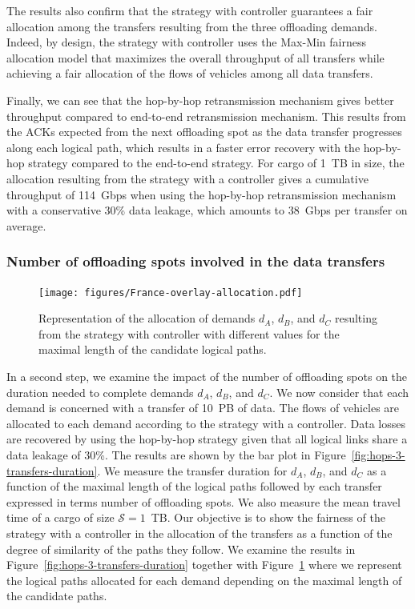 The results also confirm that the strategy with controller guarantees a fair allocation among the transfers resulting from the three offloading demands. Indeed, by design, the strategy with controller uses the \textsf{Max-Min fairness} allocation model that maximizes the overall throughput of all transfers while achieving a fair allocation of the flows of vehicles among all data transfers.

Finally, we can see that the \textsf{hop-by-hop} retransmission mechanism gives better throughput compared to \textsf{end-to-end} retransmission mechanism. This results from the ACKs expected from the next offloading spot as the data transfer progresses along each logical path, which results in a faster error recovery with the \textsf{hop-by-hop} strategy compared to the \textsf{end-to-end} strategy. For cargo of 1~TB in size, the allocation resulting from the strategy with a controller gives a cumulative throughput of 114~Gbps when using the  \textsf{hop-by-hop} retransmission mechanism with a conservative 30\% data leakage, which amounts to 38~Gbps per transfer on average. 


\subsubsection{Number of offloading spots involved in the data transfers} 
\begin{figure}[t]
    \centering
    \texttt{[image: figures/France-overlay-allocation.pdf]}
    \caption{Representation of the allocation of demands $d_A$, $d_B$, and $d_C$ resulting from the strategy with controller with different values for the maximal length of the candidate logical paths.}
    \label{fig:france-demand-allocation}
\end{figure}

In a second step, we examine the impact of the number of offloading spots on the duration needed to complete demands $d_A$, $d_B$, and $d_C$. We now consider that each demand is concerned with a transfer of 10~PB of data. The flows of vehicles are allocated to each demand according to the strategy with a controller. Data losses are recovered by using the \textsf{hop-by-hop} strategy given that all logical links share a data leakage of 30\%. The results are shown by the bar plot in   Figure~\ref{fig:hops-3-transfers-duration}. We measure the transfer duration for $d_A$, $d_B$, and $d_C$ as a function of the maximal length of the logical paths followed by each transfer expressed in terms number of offloading spots. We also measure the mean travel time of a cargo of size $\mathcal{S}=1$~TB. Our objective is to show the fairness of the strategy with a controller in the allocation of the transfers as a function of the degree of similarity of the paths they follow. We examine the results in Figure~\ref{fig:hops-3-transfers-duration} together with Figure~\ref{fig:france-demand-allocation} where we represent the logical paths allocated for each demand depending on the maximal length of the candidate paths. 

